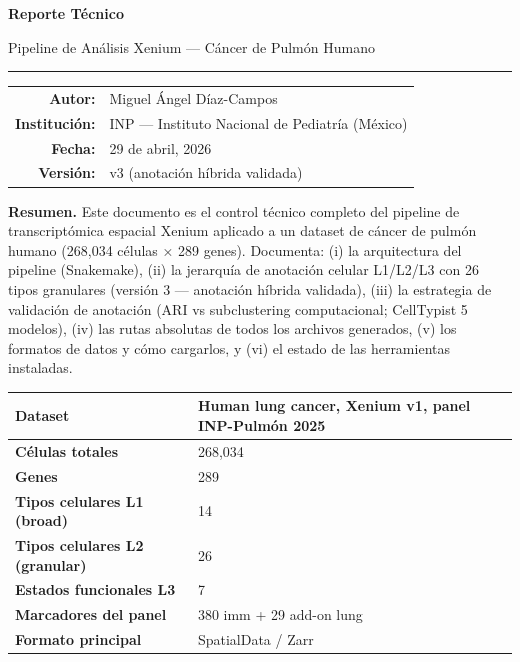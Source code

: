 \documentclass[11pt,a4paper]{article}
\begin{document}
\thispagestyle{empty}
\vspace*{1.5cm}
\begin{center}
{\Huge\bfseries\color{mblue} Reporte Técnico\par}
\vspace{0.4cm}
{\Large\color{mgray} Pipeline de Análisis Xenium — Cáncer de Pulmón Humano\par}
\vspace{1cm}
\rule{0.7\textwidth}{0.6pt}\par
\vspace{0.6cm}
{\large
\begin{tabular}{rl}
\textbf{Autor:} & Miguel Ángel Díaz-Campos \\
\textbf{Institución:} & INP --- Instituto Nacional de Pediatría (México) \\
\textbf{Fecha:} & 29 de abril, 2026 \\
\textbf{Versión:} & v3 (anotación híbrida validada) \\
\end{tabular}
}
\vspace{1.2cm}

\begin{minipage}{0.85\textwidth}
\textbf{Resumen.} Este documento es el control técnico completo del pipeline de transcriptómica espacial Xenium aplicado a un dataset de cáncer de pulmón humano (268{,}034 células × 289 genes). Documenta: (i) la arquitectura del pipeline (Snakemake), (ii) la jerarquía de anotación celular L1/L2/L3 con 26 tipos granulares (versión 3 — anotación híbrida validada), (iii) la estrategia de validación de anotación (ARI vs subclustering computacional; CellTypist 5 modelos), (iv) las rutas absolutas de todos los archivos generados, (v) los formatos de datos y cómo cargarlos, y (vi) el estado de las herramientas instaladas.
\end{minipage}
\end{center}

\vspace{1cm}
\begin{center}
\begin{tabular}{|l|l|}
\hline
\rowcolor{lightgray}\textbf{Dataset} & Human lung cancer, Xenium v1, panel INP-Pulmón 2025 \\
\hline
\textbf{Células totales} & 268{,}034 \\
\textbf{Genes} & 289 \\
\textbf{Tipos celulares L1 (broad)} & 14 \\
\textbf{Tipos celulares L2 (granular)} & 26 \\
\textbf{Estados funcionales L3} & 7 \\
\textbf{Marcadores del panel} & 380 imm + 29 add-on lung \\
\textbf{Formato principal} & SpatialData / Zarr \\
\hline
\end{tabular}
\end{center}
\end{document}
